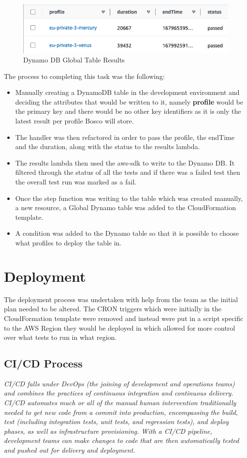 \documentclass[12pt,a4paper,titlepage]{report}
\begin{document}
\begin{figure}[ht]
  \centering
  \includegraphics[width=15cm]{./diagrams/dynamodb.png}
  \caption{Dynamo DB Global Table Results}
 \end{figure}

The process to completing this task was the following:
\begin{itemize}
\item Manually creating a DynamoDB table in the development environment and deciding the attributes that would be written to it, namely \textbf{profile} would be the primary key and there would be no other key identifiers as it is only the latest result per profile Bosco will store.
\item The handler was then refactored in order to pass the profile, the endTime and the duration, along with the status to the results lambda. 
\item The results lambda then used the aws-sdk to write to the Dynamo DB. It filtered through the status of all the tests and if there was a failed test then the overall test run was marked as a fail.
\item Once the step function was writing to the table which was created manually, a new resource, a Global Dynamo table was added to the  CloudFormation template.
\item A condition was added to the Dynamo table so that it is possible to choose what profiles to deploy the table in.
\end{itemize}

\chapter{Deployment}
The deployment process was undertaken with help from the team as the initial plan needed to be altered. 
The CRON triggers which were initially in the CloudFormation template were removed and instead were put in a script specific to the AWS Region they would be deployed in which allowed for more control over what tests to run in what region. 

\section{\ac{CI/CD} Process}
\textit{CI/CD falls under DevOps (the joining of development and operations teams) and combines the practices of continuous integration and continuous delivery. CI/CD automates much or all of the manual human intervention traditionally needed to get new code from a commit into production, encompassing the build, test (including integration tests, unit tests, and regression tests), and deploy phases, as well as infrastructure provisioning. With a CI/CD pipeline, development teams can make changes to code that are then automatically tested and pushed out for delivery and deployment.}\autocite{CICD}
\end{document}
